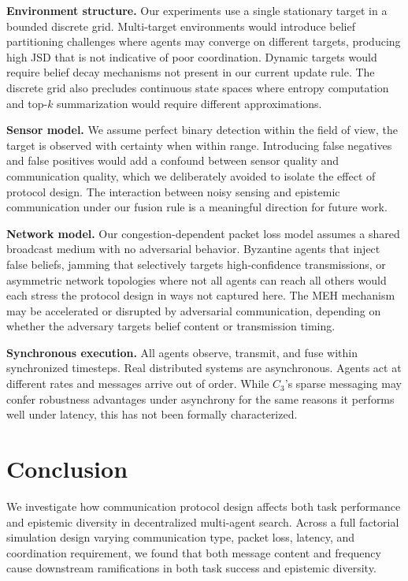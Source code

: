 \documentclass[pdflatex,sn-mathphys-num]{sn-jnl}%
\theoremstyle{thmstyleone}%
\theoremstyle{thmstyletwo}%
\theoremstyle{thmstylethree}%
\begin{document}
\textbf{Environment structure.} Our experiments use a single stationary target in a bounded discrete grid. Multi-target environments would introduce belief partitioning challenges where 
agents may converge on different targets, producing high JSD that is not indicative of poor coordination. Dynamic targets would require belief decay mechanisms not present in our 
current update rule. The discrete grid also precludes continuous state spaces where entropy computation and top-$k$ summarization would require different approximations.

\textbf{Sensor model.} We assume perfect binary detection within the field of view, the target is observed with certainty when within range. Introducing false negatives and false positives 
would add a confound between sensor quality and communication quality, which we deliberately avoided to isolate the effect of protocol design. The interaction between noisy sensing and 
epistemic communication under our fusion rule is a meaningful direction for future work.

\textbf{Network model.} Our congestion-dependent packet loss model assumes a shared broadcast medium with no adversarial behavior. Byzantine agents that inject false beliefs, jamming 
that selectively targets high-confidence transmissions, or asymmetric network topologies where not all agents can reach all others would each stress the protocol design in ways not 
captured here. The MEH mechanism may be accelerated or disrupted by adversarial communication, depending on whether the adversary targets belief content or transmission timing.

\textbf{Synchronous execution.} All agents observe, transmit, and fuse within synchronized timesteps. Real distributed systems are asynchronous. Agents act at different rates and messages arrive out of order. While $C_3$'s sparse messaging may confer robustness advantages under asynchrony for the same reasons it performs well under latency, this has not been formally characterized.

\section{Conclusion}
We investigate how communication protocol design affects both task performance and epistemic diversity in decentralized multi-agent search. Across a full factorial simulation design varying communication type, packet loss, latency, and coordination requirement, we found that both message content and frequency cause downstream ramifications in both task success and epistemic diversity.
\end{document}
